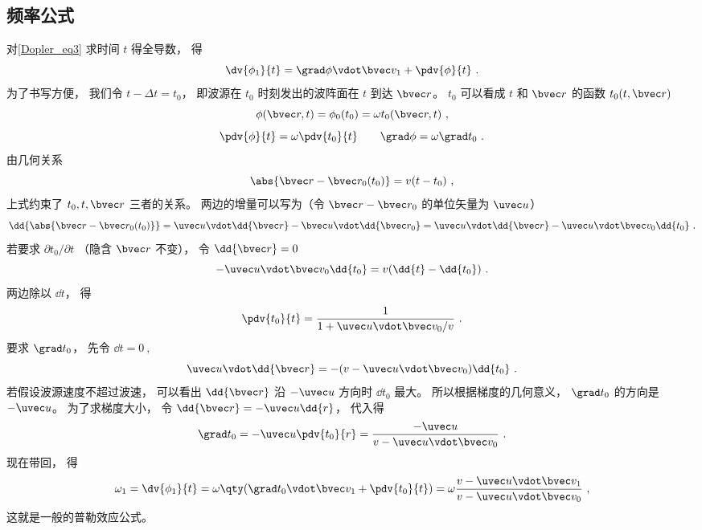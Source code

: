 \subsection{频率公式}
对\autoref{Dopler_eq3} 求时间 $t$ 得全导数， 得
\begin{equation}
\dv{\phi_1}{t} = \grad\phi \vdot \bvec v_1 + \pdv{\phi}{t}~.
\end{equation}
为了书写方便， 我们令 $t - \Delta t = t_0$， 即波源在 $t_0$ 时刻发出的波阵面在 $t$ 到达 $\bvec r$。 $t_0$ 可以看成 $t$ 和 $\bvec r$ 的函数  $t_0(t, \bvec r)$
\begin{equation}
\phi(\bvec r, t) =  \phi_0(t_0) = \omega t_0(\bvec r, t)~,
\end{equation}
\begin{equation}
\pdv{\phi}{t} = \omega \pdv{t_0}{t} \qquad
\grad \phi = \omega \grad t_0~.
\end{equation}
由几何关系
\begin{equation}
\abs{\bvec r - \bvec r_0(t_0)} = v(t - t_0)~,
\end{equation}
上式约束了 $t_0, t, \bvec r$ 三者的关系。 两边的增量可以写为（令 $\bvec r - \bvec r_0$ 的单位矢量为 $\uvec u$）
\begin{equation}
\dd{\abs{\bvec r - \bvec r_0(t_0)}} = \uvec u \vdot \dd{\bvec r} - \bvec u \vdot \dd{\bvec r_0} = \uvec u \vdot \dd{\bvec r} - \uvec u \vdot \bvec v_0 \dd{t_0}~.
\end{equation}
若要求 $\partial t_0 / \partial t$ （隐含 $\bvec r$ 不变）， 令 $\dd{\bvec r} = 0$
\begin{equation}
-\uvec u \vdot \bvec v_0 \dd{t_0} = v(\dd{t} - \dd{t_0})~.
\end{equation}
两边除以 $\dd{t}$， 得
\begin{equation}
\pdv{t_0}{t} = \frac{1}{1 + \uvec u \vdot \bvec v_0/v}~.
\end{equation}
要求 $\grad t_0$， 先令 $\dd{t} = 0~,$
\begin{equation}
\uvec u \vdot \dd{\bvec r} = -(v - \uvec u \vdot \bvec v_0) \dd{t_0}~.
\end{equation}
若假设波源速度不超过波速， 可以看出 $\dd{\bvec r}$ 沿 $-\uvec u$ 方向时 $\dd{t_0}$ 最大。 所以根据梯度的几何意义， $\grad t_0$ 的方向是 $-\uvec u$。 为了求梯度大小， 令 $\dd{\bvec r} = -\uvec u \dd{r}$， 代入得
\begin{equation}
\grad t_0 = -\uvec u \pdv{t_0}{r} = \frac{ - \uvec u}{v - \uvec u \vdot \bvec v_0}~.
\end{equation}
现在带回， 得
\begin{equation}
\omega_1 = \dv{\phi_1}{t} = \omega\qty(\grad t_0 \vdot \bvec v_1 + \pdv{t_0}{t}) = \omega \frac{v - \uvec u \vdot \bvec v_1}{v - \uvec u \vdot \bvec v_0}~,
\end{equation}
这就是一般的普勒效应公式。
